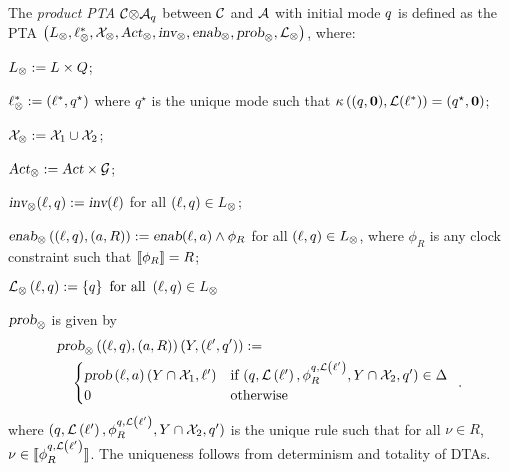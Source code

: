 The \emph{product PTA} ${\mathcal{C}}{\otimes}{\mathcal{A}_q}$ between $\mathcal{C}$ and $\mathcal{A}$ with initial mode $q$ is defined as the PTA $\left({L}_\otimes, \ell^*_\otimes, \mathcal{X}_\otimes, \mbox{\sl Act}_\otimes, \mbox{\sl inv}_\otimes, \mbox{\sl enab}_\otimes,  \mbox{\sl prob}_\otimes, \mathcal{L}_\otimes\right)$, where:
\begin{compactitem}
\item $L_\otimes:=L\times Q$;
\item $\ell^*_\otimes:=(\ell^*, q^\star)$ where $q^\star$ is the unique mode such that $\kappa\left((q,\mathbf{0}), \mathcal{L}(\ell^*)\right)=(q^\star,\mathbf{0})$; %
\item $\mathcal{X}_\otimes:=\mathcal{X}_1\cup\mathcal{X}_2$;
\item $\mbox{\sl Act}_\otimes:=\mbox{\sl Act}\times\mathcal{G}$; %
\item $\mbox{\sl inv}_\otimes(\ell,q):=\mbox{\sl inv}(\ell)$ for all $(\ell,q)\in L_\otimes$;
\item $\mbox{\sl enab}_\otimes\left((\ell,q), (a,R)\right):=\mbox{\sl enab}(\ell,a)\wedge \phi_R$ for all $(\ell,q)\in L_\otimes$, where $\phi_R$ is any clock constraint such that ${\llbracket}{\phi_R}{\rrbracket}=R$;
\item 
$
    \mathcal{L}_\otimes \left(
        \ell,q
    \right)
        := \left \{
            q
        \right \}
    \mbox{ for all } \left ( 
        \ell,q
    \right )
    \in L_\otimes
$
\item $\mbox{\sl prob}_\otimes$ is given by
\begin{align*}
&\prob_\otimes\left((\loc,\dtloc),(a,R)\right)(Y,(\loc',\dtloc')):=\\
&\quad\begin{cases}
\prob\left(\loc,a\right)(Y\cap \clocks_1,\loc') & \mbox{if } (\dtloc,\lbfunc\left(\loc'\right), \phi^{\dtloc,\lbfunc\left(\loc'\right)}_R, Y\cap \clocks_2, \dtloc')\in\rules\\%
0 & \mbox{otherwise}
\end{cases}\enskip.
\end{align*}
where $(q,\mathcal{L}\left(\ell'\right), \phi^{q,\mathcal{L}\left(\ell'\right)}_R, Y\cap \mathcal{X}_2, q')$ is the unique rule such that for all $\nu\in R$, $\nu\in{\llbracket}{\phi^{q,\mathcal{L}\left(\ell'\right)}_R}{\rrbracket}$.
The uniqueness follows from determinism and totality of DTAs.
\end{compactitem}

